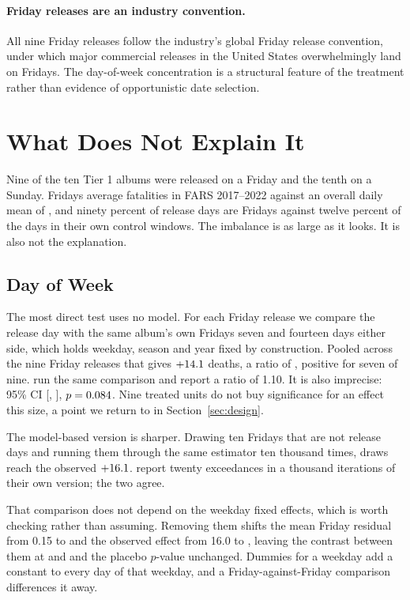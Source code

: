 \documentclass[11pt]{article}
\begin{document}
\paragraph{Friday releases are an industry convention.}
All nine Friday releases follow the industry's global Friday release convention, under which major
commercial releases in the United States overwhelmingly land on Fridays. The day-of-week
concentration is a structural feature of the treatment rather than evidence of opportunistic date
selection.

\section{What Does Not Explain It}
\label{sec:empirical_issues}

Nine of the ten Tier 1 albums were released on a Friday and the tenth on a Sunday. Fridays average
\numFridayMean{} fatalities in FARS 2017--2022 against an overall daily mean of \numOverallMean{},
and ninety percent of release days are Fridays against twelve percent of the days in their own
control windows. The imbalance is as large as it looks. It is also not the explanation.

\subsection{Day of Week}

The most direct test uses no model. For each Friday release we compare the release day with the
same album's own Fridays seven and fourteen days either side, which holds weekday, season and year
fixed by construction. Pooled across the nine Friday releases that gives
$+14.1$ deaths, a ratio of \numRatioAdjacentFriday{}, positive for seven of
nine. \citet{patel2026smartphones} run the same comparison and report a ratio of 1.10. It is also
imprecise: 95\% CI [\numCIAdjacentFridayLo, \numCIAdjacentFridayHi], $p = 0.084$.
Nine treated units do not buy significance for an effect this size, a point we return to in
Section~\ref{sec:design}.

The model-based version is sharper. Drawing ten Fridays that are not release days and running them
through the same estimator ten thousand times, \numFridayPlaceboDraws{} draws reach the observed
$+16.1$. \citet{patel2026smartphones} report twenty exceedances in a thousand
iterations of their own version; the two agree.

That comparison does not depend on the weekday fixed effects, which is worth checking rather than
assuming. Removing them shifts the mean Friday residual from 0.15 to \numFridayResidNoDow{} and
the observed effect from 16.0 to \numObservedNoDow{}, leaving the contrast between them at
\numContrastWithDow{} and \numContrastNoDow{} and the placebo $p$-value unchanged. Dummies for a
weekday add a constant to every day of that weekday, and a Friday-against-Friday comparison
differences it away.
\end{document}
